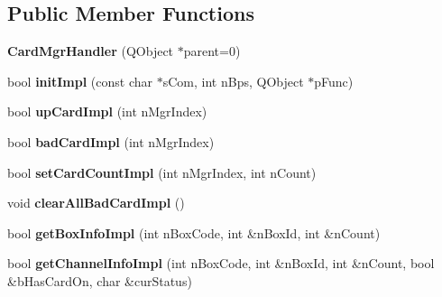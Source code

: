 \subsection*{Public Member Functions}
\begin{DoxyCompactItemize}
\item 
\hypertarget{class_card_mgr_handler_a2f819a7d7c21b1959a577a3acc7b43a9}{{\bfseries Card\-Mgr\-Handler} (Q\-Object $\ast$parent=0)}\label{class_card_mgr_handler_a2f819a7d7c21b1959a577a3acc7b43a9}

\item 
\hypertarget{class_card_mgr_handler_a33f4ae97efa047d4e688fa4ef80b46bf}{bool {\bfseries init\-Impl} (const char $\ast$s\-Com, int n\-Bps, Q\-Object $\ast$p\-Func)}\label{class_card_mgr_handler_a33f4ae97efa047d4e688fa4ef80b46bf}

\item 
\hypertarget{class_card_mgr_handler_ab5e14276a91c3c10dbd9c06a48bc925d}{bool {\bfseries up\-Card\-Impl} (int n\-Mgr\-Index)}\label{class_card_mgr_handler_ab5e14276a91c3c10dbd9c06a48bc925d}

\item 
\hypertarget{class_card_mgr_handler_ad440e9ae57d85ca72734ecf97ce00579}{bool {\bfseries bad\-Card\-Impl} (int n\-Mgr\-Index)}\label{class_card_mgr_handler_ad440e9ae57d85ca72734ecf97ce00579}

\item 
\hypertarget{class_card_mgr_handler_a194bcf3d9de1a33598f18d5fe44251a8}{bool {\bfseries set\-Card\-Count\-Impl} (int n\-Mgr\-Index, int n\-Count)}\label{class_card_mgr_handler_a194bcf3d9de1a33598f18d5fe44251a8}

\item 
\hypertarget{class_card_mgr_handler_a37c98f246907e10b056e4cadbb20c724}{void {\bfseries clear\-All\-Bad\-Card\-Impl} ()}\label{class_card_mgr_handler_a37c98f246907e10b056e4cadbb20c724}

\item 
\hypertarget{class_card_mgr_handler_a11a31f5729a35377925fafd218964764}{bool {\bfseries get\-Box\-Info\-Impl} (int n\-Box\-Code, int \&n\-Box\-Id, int \&n\-Count)}\label{class_card_mgr_handler_a11a31f5729a35377925fafd218964764}

\item 
\hypertarget{class_card_mgr_handler_a7eca19b4c8fa074a8f70894c74e20405}{bool {\bfseries get\-Channel\-Info\-Impl} (int n\-Box\-Code, int \&n\-Box\-Id, int \&n\-Count, bool \&b\-Has\-Card\-On, char \&cur\-Status)}\label{class_card_mgr_handler_a7eca19b4c8fa074a8f70894c74e20405}

\end{DoxyCompactItemize}

